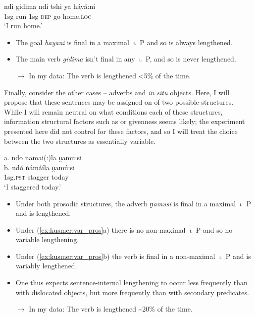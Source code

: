 \documentclass[output=paper 
,modfonts
,nonflat]{langsci/langscibook}
\begin{document}
\ea \label{ex:kusmer:sec_pros}
\gll {\lipm} ndi gidima {\lipn} ndi tshi ya háyá:ni {\ripn} {\ripm}\\
{} 1sg run {} 1sg \textsc{dep} go home.\textsc{loc} {} {}\\
	\glt `I run home.'
	\z

\begin{itemize}

	\item The goal \textit{hayani} is final in a maximal  $\upiota$ P and so is always
		lengthened.

	\item The main verb \textit{gidima} isn't final in any $\upiota$ P, and so is never lengthened.
	\item[$\rightarrow$] In my data: The verb is lengthened <5\% of the time.
\end{itemize}

Finally, consider the other cases -- adverbs and \textit{in situ} objects.
Here, I will propose that these sentences may be assigned on of two possible
structures. While I will remain neutral on what conditions each of these
structures, information structural factors such as  or givenness seems
likely; the experiment presented here did not control for these factors, and so
I will treat the choice between the two structures as essentially variable.



\ea \label{ex:kusmer:var_pros} 
\glll a. {\hspace{1em}} {\lipm} {\lipn} ndo ṅamai(:)la {\ripn} ṋamu:si {\ripm}\\
b. {} {\lipm} {} ndó ṅámáíla {} ṋamú:si {\ripm}\\
{} {} {} {} 1sg.\textsc{pst} stagger {} today {}\\
		\glt  `I staggered today.'
\z

		  \begin{itemize}
	\item Under both prosodic structures, the adverb \textit{ṋamusi} is final in a
		maximal $\upiota$ P and is lengthened.
	\item Under (\ref{ex:kusmer:var_pros}a) there is no non-maximal $\upiota$ P and so no variable
		lengthening.
	\item Under (\ref{ex:kusmer:var_pros}b) the verb is final in a non-maximal $\upiota$ P and is
		variably lengthened.
	\item One thus expects sentence-internal lengthening to occur less frequently
		than with dislocated objects, but more frequently than with secondary
		predicates.
	\item[$\rightarrow$] In my data: The verb is lengthened \textasciitilde 20\%
		of the time.

\end{itemize}
\end{document}
